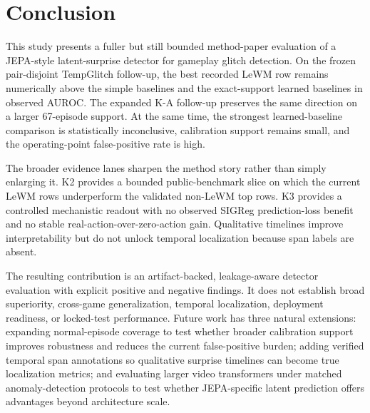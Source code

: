 \section{Conclusion}
\label{sec:conclusion}

This study presents a fuller but still bounded method-paper evaluation of a JEPA-style
latent-surprise detector for gameplay glitch detection. On the frozen pair-disjoint TempGlitch
follow-up, the best recorded LeWM row remains numerically above the simple baselines and the
exact-support learned baselines in observed AUROC. The expanded K-A follow-up preserves the same
direction on a larger 67-episode support. At the same time, the strongest learned-baseline
comparison is statistically inconclusive, calibration support remains small, and the
operating-point false-positive rate is high.

The broader evidence lanes sharpen the method story rather than simply enlarging it. K2 provides a
bounded public-benchmark slice on which the current LeWM rows underperform the validated
non-LeWM top rows. K3 provides a controlled mechanistic readout with no observed SIGReg
prediction-loss benefit and no stable real-action-over-zero-action gain. Qualitative timelines
improve interpretability but do not unlock temporal localization because span labels are absent.

The resulting contribution is an artifact-backed, leakage-aware detector evaluation with explicit
positive and negative findings. It does not establish broad superiority, cross-game
generalization, temporal localization, deployment readiness, or locked-test performance. Future
work has three natural extensions: expanding normal-episode coverage to test whether broader
calibration support improves robustness and reduces the current false-positive burden; adding
verified temporal span annotations so qualitative surprise timelines can become true localization
metrics; and
evaluating larger video transformers under matched anomaly-detection protocols to test whether
JEPA-specific latent prediction offers advantages beyond architecture scale.
